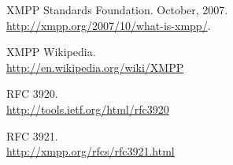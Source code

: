 \documentclass[a4paper, 11pt]{article} %
\begin{document}
  
\vfill
\begin{thebibliography}{9}

  XMPP Standards Foundation. October, 2007.\\
  \url{http://xmpp.org/2007/10/what-is-xmpp/}.
  
  XMPP Wikipedia.\\
  \url{http://en.wikipedia.org/wiki/XMPP}
  
  RFC 3920.\\
  \url{http://tools.ietf.org/html/rfc3920}
  
  RFC 3921.\\
  \url{http://xmpp.org/rfcs/rfc3921.html}
\end{thebibliography}  
  
\end{document}
